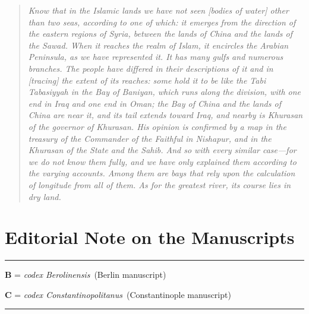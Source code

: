 \documentclass[11pt,a4paper]{article}
\newcommand{\codB}{\textit{codex Berolinensis}}
\newcommand{\codC}{\textit{codex Constantinopolitanus}}
\begin{document}
\bigskip

\begin{quote}
\small
\textit{Know that in the Islamic lands we have not seen [bodies of water] other than two seas, according to one of which: it emerges from the direction of the eastern regions of Syria, between the lands of China and the lands of the Sawad. When it reaches the realm of Islam, it encircles the Arabian Peninsula, as we have represented it. It has many gulfs and numerous branches. The people have differed in their descriptions of it and in [tracing] the extent of its reaches: some hold it to be like the Tabi Tabasiyyah in the Bay of Baniyan, which runs along the division, with one end in Iraq and one end in Oman; the Bay of China and the lands of China are near it, and its tail extends toward Iraq, and nearby is Khurasan of the governor of Khurasan. His opinion is confirmed by a map in the treasury of the Commander of the Faithful in Nishapur, and in the Khurasan of the State and the Sahib. And so with every similar case---for we do not know them fully, and we have only explained them according to the varying accounts. Among them are bays that rely upon the calculation of longitude from all of them. As for the greatest river, its course lies in dry land.}
\end{quote}

\clearpage


\section*{Editorial Note on the Manuscripts}

\begin{center}
\rule{0.5\textwidth}{0.6pt}
\end{center}

\vspace{0.5cm}

\textbf{B} = \codB\ (Berlin manuscript)

\textbf{C} = \codC\ (Constantinople manuscript)

\vspace{0.5cm}

\begin{center}
\rule{0.5\textwidth}{0.6pt}
\end{center}
\end{document}
